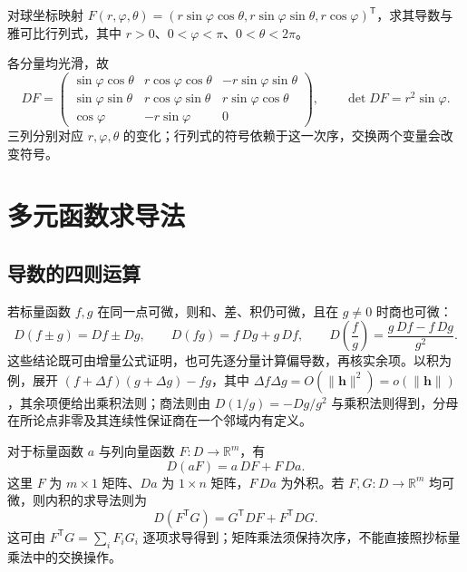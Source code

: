 \begin{example}
\label{ex:spherical-jacobian-ch14}
对球坐标映射 $F(r,\varphi,\theta)=(r\sin\varphi\cos\theta,r\sin\varphi\sin\theta,r\cos\varphi)^{\mathsf T}$，求其导数与雅可比行列式，其中 $r>0$、$0<\varphi<\pi$、$0<\theta<2\pi$。
\end{example}
\begin{solve}
各分量均光滑，故
\[
    DF=
    \begin{pmatrix}
    \sin\varphi\cos\theta&r\cos\varphi\cos\theta&-r\sin\varphi\sin\theta\\
    \sin\varphi\sin\theta&r\cos\varphi\sin\theta&r\sin\varphi\cos\theta\\
    \cos\varphi&-r\sin\varphi&0
    \end{pmatrix},\qquad
    \det DF=r^2\sin\varphi.
\]
三列分别对应 $r,\varphi,\theta$ 的变化；行列式的符号依赖于这一次序，交换两个变量会改变符号。
\end{solve}

\section{多元函数求导法}
\label{sec:multivariable-differentiation-rules}


\subsection{导数的四则运算}
\label{subsec:arithmetic-rules-for-multivariable-derivatives}

若标量函数 $f,g$ 在同一点可微，则和、差、积仍可微，且在 $g\ne0$ 时商也可微：
\[
    D(f\pm g)=Df\pm Dg,\qquad
    D(fg)=f\,Dg+g\,Df,\qquad
    D\!\left(\frac fg\right)=\frac{g\,Df-f\,Dg}{g^2}.
\]
这些结论既可由增量公式证明，也可先逐分量计算偏导数，再核实余项。以积为例，展开 $(f+\Delta f)(g+\Delta g)-fg$，其中 $\Delta f\Delta g=O(\|\boldsymbol h\|^2)=o(\|\boldsymbol h\|)$，其余项便给出乘积法则；商法则由 $D(1/g)=-Dg/g^2$ 与乘积法则得到，分母在所论点非零及其连续性保证商在一个邻域内有定义。

对于标量函数 $a$ 与列向量函数 $F:D\to\mathbb R^m$，有
\[
    D(aF)=a\,DF+F\,Da.
\]
这里 $F$ 为 $m\times1$ 矩阵、$Da$ 为 $1\times n$ 矩阵，$F\,Da$ 为外积。若 $F,G:D\to\mathbb R^m$ 均可微，则内积的求导法则为
\[
    D(F^{\mathsf T}G)=G^{\mathsf T}DF+F^{\mathsf T}DG.
\]
这可由 $F^{\mathsf T}G=\sum_iF_iG_i$ 逐项求导得到；矩阵乘法须保持次序，不能直接照抄标量乘法中的交换操作。

